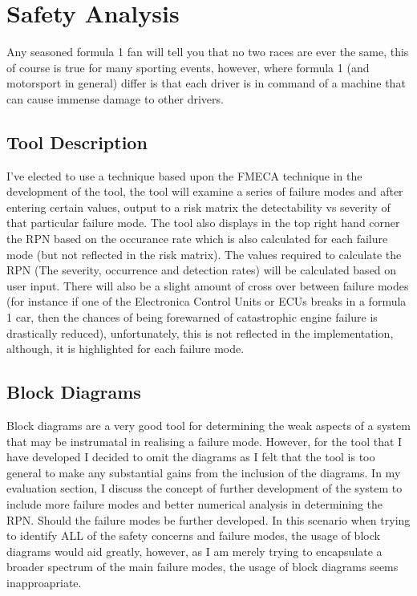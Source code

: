 \documentclass[12pt]{article} %
\begin{document}



\section{Safety Analysis} %

Any seasoned formula 1 fan will tell you that no two races are ever the same, this of course is true for many sporting events, however, where formula 1 (and motorsport in general) differ is that each driver is in command of a machine that can cause immense damage to other drivers.


\subsection{Tool Description}

I've elected to use a technique based upon the FMECA technique in the development of the tool, the tool will examine a series of failure modes and after entering certain values, output to a risk matrix the detectability vs severity of that particular failure mode. The tool also displays in the top right hand corner the RPN based on the occurance rate which is also calculated for each failure mode (but not reflected in the risk matrix). The values required to calculate the RPN (The severity, occurrence and detection rates) will be calculated based on  user input. There will also be a slight amount of cross over between failure modes (for instance if one of the Electronica Control Units or ECUs breaks in a formula 1 car, then the chances of being forewarned of catastrophic engine failure is drastically reduced), unfortunately, this is not reflected in the implementation, although, it is highlighted for each failure mode.

\subsection{Block Diagrams}

Block diagrams are a very good tool for determining the weak aspects of a system that may be instrumatal in realising a failure mode. However, for the tool that I have developed I decided to omit the diagrams as I felt that the tool is too general to make any substantial gains from the inclusion of the diagrams. In my evaluation section, I discuss the concept of further development of the system to include more failure modes and better numerical analysis in determining the RPN. Should the failure modes be further developed. In this scenario when trying to identify ALL of the safety concerns and failure modes, the usage of block diagrams would aid greatly, however, as I am merely trying to encapsulate a broader spectrum of the main failure modes, the usage of block diagrams seems inapproapriate.
\end{document}
